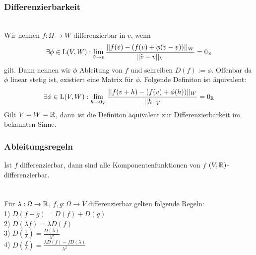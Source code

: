 \subsubsection*{Differenzierbarkeit}
 \\
Wir nennen \(f : \Omega \rightarrow W\) differenzierbar in \(v\), wenn \[\exists \phi \in \text L(V,W): \lim_{\tilde v \rightarrow v} \frac{||f(\tilde v) - (f(v) + \phi(\tilde v - v))||_W}{||\tilde v - v||_V} = 0_\mathbb R\]
gilt. Dann nennen wir \(\phi\) Ableitung von \(f\) und schreiben \(D(f) := \phi\). Offenbar da \(\phi\) linear stetig ist, existiert eine Matrix für \(\phi\). Folgende Definiton ist äquivalent: \[\exists \phi \in \text L(V,W): \lim_{h \rightarrow 0_V} \frac{||f(v + h) - (f(v) + \phi(h))||_W}{||h||_V} = 0_\mathbb R\]
Gilt \(V = W = \mathbb R\), dann ist die Definiton äquivalent zur Differenzierbarkeit im bekannten Sinne.
\subsubsection*{Ableitungsregeln}
Ist \(f\) differenzierbar, dann sind alle Komponentenfunktionen von \(f\) \((V,\mathbb R)\)-differenzierbar. \\ \\
 \\
Für \(\lambda : \Omega \rightarrow \mathbb R\), \(f,g : \Omega \rightarrow V\) differenzierbar gelten folgende Regeln:\\
1) \(D(f+g) = D(f) + D(g)\) \\
2) \(D(\lambda f) = \lambda D(f)\) \\
3) \(D\left(\frac{1}{\lambda}\right) = \frac{D(\lambda)}{\lambda^2}\) \\
4) \(D\left(\frac{f}{\lambda}\right) = \frac{\lambda D(f) - fD(\lambda)}{\lambda^2}\) \pagebreak
